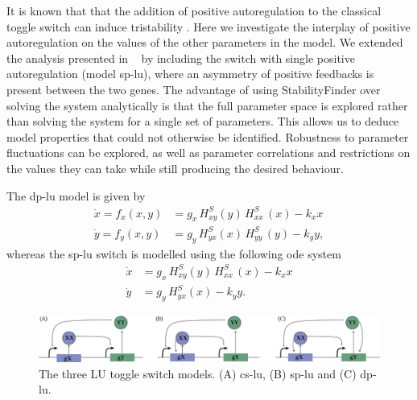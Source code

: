 {It is known that that the addition of positive autoregulation to the classical toggle switch can induce tristability  \autocite{XXX, Lu:2014kc}. Here we investigate the interplay of positive autoregulation on the values of the other parameters in the model. We extended the analysis presented in ~\textcite{Lu:2014kc} by including the switch with single positive autoregulation (model \acrshort{sp-lu}), where an asymmetry of positive feedbacks is present between the two genes. The advantage of using StabilityFinder over solving the system analytically is that the full parameter space is explored rather than solving the system for a single set of parameters. This allows us to deduce model properties that could not otherwise be identified. Robustness to parameter fluctuations can be explored, as well as parameter correlations and restrictions on the values they can take while still producing the desired behaviour.  

The \acrshort{dp-lu} model is given by
\begin{align*}
\dot{x} = f_{x}(x,y) &= g_{x}\, H^{S}_{xy}(y)\, H^{S}_{xx}\,(x)-k_{x}x \\
\dot{y} = f_{y}(x,y) &= g_{y}\,H^{S}_{yx}(x)\,H^{S}_{yy}\,(y)-k_{y}y,
\end{align*}
whereas the \acrshort{sp-lu} switch is modelled using the following \acrshort{ode} system
\begin{align*}
\dot{x} & = g_{x}\, H^{S}_{xy}(y)\, H^{S}_{xx}\,(x)-k_{x}x \\
\dot{y} & = g_{y}\,H^{S}_{yx}(x) - k_{y}y.
\end{align*}


\begin{figure}[htbp]
\begin{center}
	\includegraphics[width=\textwidth]{chapterStabilityFinder/images/LU_diagrams.png}
	\caption[LoF caption]{\label{fig:lu_mods} The three LU toggle switch models. (A) \acrshort{cs-lu}, (B) \acrshort{sp-lu} and (C) \acrshort{dp-lu}.   }
\end{center}
\end{figure}



}
